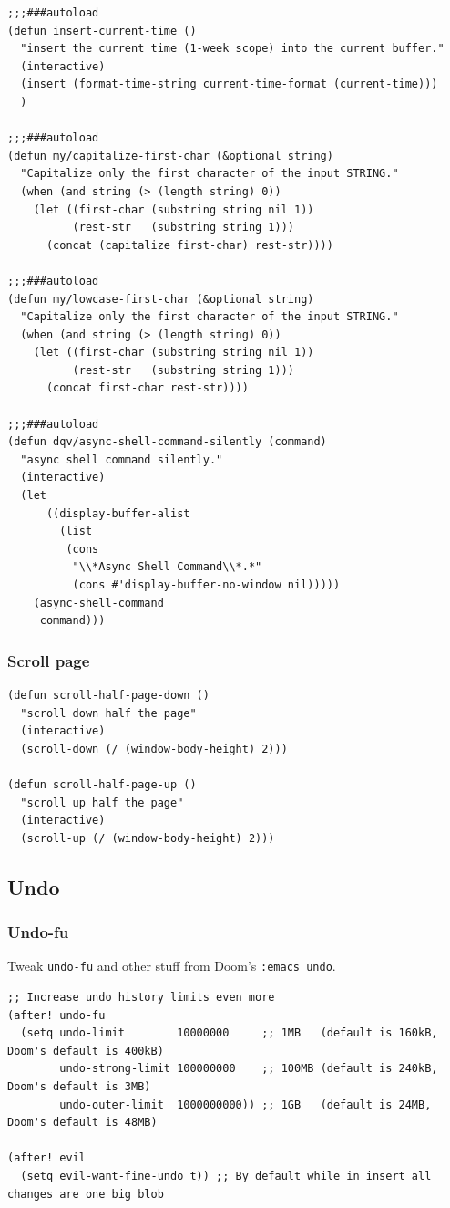 \documentclass[11pt]{article}
\begin{document}
\begin{verbatim}
;;;###autoload
(defun insert-current-time ()
  "insert the current time (1-week scope) into the current buffer."
  (interactive)
  (insert (format-time-string current-time-format (current-time)))
  )

;;;###autoload
(defun my/capitalize-first-char (&optional string)
  "Capitalize only the first character of the input STRING."
  (when (and string (> (length string) 0))
    (let ((first-char (substring string nil 1))
          (rest-str   (substring string 1)))
      (concat (capitalize first-char) rest-str))))

;;;###autoload
(defun my/lowcase-first-char (&optional string)
  "Capitalize only the first character of the input STRING."
  (when (and string (> (length string) 0))
    (let ((first-char (substring string nil 1))
          (rest-str   (substring string 1)))
      (concat first-char rest-str))))

;;;###autoload
(defun dqv/async-shell-command-silently (command)
  "async shell command silently."
  (interactive)
  (let
      ((display-buffer-alist
        (list
         (cons
          "\\*Async Shell Command\\*.*"
          (cons #'display-buffer-no-window nil)))))
    (async-shell-command
     command)))
\end{verbatim}

\subsubsection{Scroll page}
\label{sec:orgb524d54}
\begin{verbatim}
(defun scroll-half-page-down ()
  "scroll down half the page"
  (interactive)
  (scroll-down (/ (window-body-height) 2)))

(defun scroll-half-page-up ()
  "scroll up half the page"
  (interactive)
  (scroll-up (/ (window-body-height) 2)))
\end{verbatim}

\subsection{Undo}
\label{sec:org9f6da8e}
\subsubsection{Undo-fu}
\label{sec:org88da1f7}
Tweak \texttt{undo-fu} and other stuff from Doom's \texttt{:emacs undo}.

\begin{verbatim}
;; Increase undo history limits even more
(after! undo-fu
  (setq undo-limit        10000000     ;; 1MB   (default is 160kB, Doom's default is 400kB)
        undo-strong-limit 100000000    ;; 100MB (default is 240kB, Doom's default is 3MB)
        undo-outer-limit  1000000000)) ;; 1GB   (default is 24MB,  Doom's default is 48MB)

(after! evil
  (setq evil-want-fine-undo t)) ;; By default while in insert all changes are one big blob
\end{verbatim}
\end{document}
